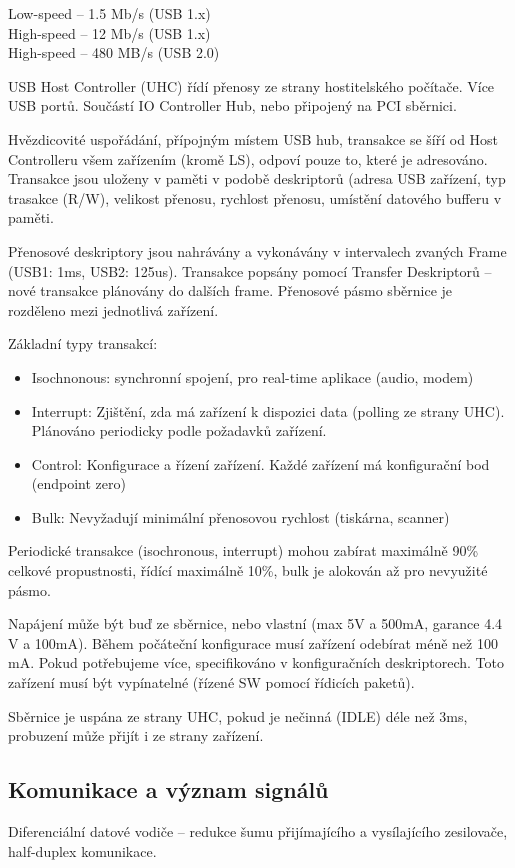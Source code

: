 \documentclass[a4paper, 11pt]{report}
\begin{document}
Low-speed -- 1.5 Mb/s (USB 1.x)\\
High-speed -- 12 Mb/s (USB 1.x)\\
High-speed -- 480 MB/s (USB 2.0)

USB Host Controller (UHC) řídí přenosy ze strany hostitelského počítače. Více USB portů. Součástí IO Controller Hub, nebo připojený na PCI sběrnici.

Hvězdicovité uspořádání, přípojným místem USB hub, transakce se šíří od Host Controlleru všem zařízením (kromě LS), odpoví pouze to, které je adresováno. Transakce jsou uloženy v paměti v podobě deskriptorů (adresa USB zařízení, typ trasakce (R/W), velikost přenosu, rychlost přenosu, umístění datového bufferu v paměti.

Přenosové deskriptory jsou nahrávány a vykonávány v intervalech zvaných Frame (USB1: 1ms, USB2: 125us). Transakce popsány pomocí Transfer Deskriptorů -- nové transakce plánovány do dalších frame. Přenosové pásmo sběrnice je rozděleno mezi jednotlivá zařízení.

Základní typy transakcí:
\begin{itemize}
	\item Isochnonous: synchronní spojení, pro real-time aplikace (audio, modem)
	\item Interrupt: Zjištění, zda má zařízení k dispozici data (polling ze strany UHC). Plánováno periodicky podle požadavků zařízení.
	\item Control: Konfigurace a řízení zařízení. Každé zařízení má konfigurační bod (endpoint zero)
	\item Bulk: Nevyžadují minimální přenosovou rychlost (tiskárna, scanner)
\end{itemize}
Periodické transakce (isochronous, interrupt) mohou zabírat maximálně 90\% celkové propustnosti, řídící maximálně 10\%, bulk je alokován až pro nevyužité pásmo.

Napájení může být buď ze sběrnice, nebo vlastní (max 5V a 500mA, garance 4.4 V a 100mA). Během počáteční konfigurace musí zařízení odebírat méně než 100 mA. Pokud potřebujeme více, specifikováno v konfiguračních deskriptorech. Toto zařízení musí být vypínatelné (řízené SW pomocí řídicích paketů).

Sběrnice je uspána ze strany UHC, pokud je nečinná (IDLE) déle než 3ms, probuzení může přijít i ze strany zařízení.
\subsection{Komunikace a význam signálů}
Diferenciální datové vodiče -- redukce šumu přijímajícího a vysílajícího zesilovače, half-duplex komunikace.
\end{document}
